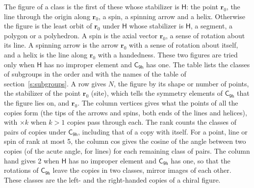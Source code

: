 \documentclass[10pt,a4paper]{article}
\numberwithin{equation}{section}
\newcommand{\grp}[1]{\mathsf{#1}}
\newcommand{\pointr}{\mathbf{r}}
\begin{document}
\leavevmode\label{n:head.figure}The figure of a class is the first of these whose stabilizer is $\grp{H}$: the point $\pointr_0$, the line through the origin along $\pointr_0$, a spin, a spinning arrow and a helix. Otherwise the figure is the least orbit of $\pointr_0$ under $\grp{H}$ whose stabilizer is $\grp{H}$, a segment, a polygon or a polyhedron. A spin is the axial vector $\pointr_0$, a sense of rotation about its line. A spinning arrow is the arrow $\pointr_0$ with a sense of rotation about itself, and a helix is the line along $\pointr_0$ with a handedness. These two figures are tried only when $\grp{H}$ has no improper element and $\grp{C_{9h}}$ has one. The table lists the classes of subgroups in the order and with the names of the table of section~\ref{s:subgroups}. \label{n:head.site}A row gives $N$, the figure by its shape or number of points, the stabilizer of the point $\pointr_0$ (site), which tells the symmetry elements of $\grp{C_{9h}}$ that the figure lies on, and $\pointr_0$. \label{n:head.vertices}The column vertices gives what the points of all the copies form (the tips of the arrows and spins, both ends of the lines and helices), with ${\times}k$ when $k > 1$ copies pass through each. \label{n:head.rank}The rank counts the classes of pairs of copies under $\grp{C_{9h}}$, including that of a copy with itself. \label{n:head.cos}For a point, line or spin of rank at most 5, the column cos gives the cosine of the angle between two copies (of the acute angle, for lines) for each remaining class of pairs. \label{n:head.hand}The column hand gives 2 when $\grp{H}$ has no improper element and $\grp{C_{9h}}$ has one, so that the rotations of $\grp{C_{9h}}$ leave the copies in two classes, mirror images of each other. These classes are the left- and the right-handed copies of a chiral figure.
\end{document}
